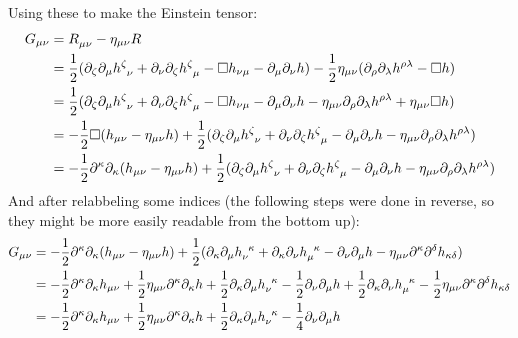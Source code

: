 \documentclass[12pt,a4]{article}
\begin{document}
\begin{enumerate}
    Using these to make the Einstein tensor:
    \begin{align*}
      G_{\mu\nu}  &= \tensor{R}{_\mu_\nu} - \eta_{\mu\nu}R\\
                  &= \frac{1}{2} (\partial_\zeta \partial_\mu\tensor{h}{^\zeta_\nu} + \partial_\nu \partial_\zeta \tensor{h}{^\zeta_\mu} - \Box h_{\nu\mu} - \partial_\mu \partial_\nu h) -\frac{1}{2}\eta_{\mu\nu}(\partial_\rho \partial_\lambda\tensor{h}{^\rho^\lambda}- \Box h)\\
                  &= \frac{1}{2} (\partial_\zeta \partial_\mu\tensor{h}{^\zeta_\nu} + \partial_\nu \partial_\zeta \tensor{h}{^\zeta_\mu} - \Box h_{\nu\mu} - \partial_\mu \partial_\nu h -\eta_{\mu\nu}\partial_\rho \partial_\lambda\tensor{h}{^\rho^\lambda} + \eta_{\mu\nu}\Box h)\\
                  &= -\frac{1}{2}\Box( h_{\mu\nu} -  \eta_{\mu\nu} h) + \frac{1}{2} (\partial_\zeta \partial_\mu\tensor{h}{^\zeta_\nu} + \partial_\nu \partial_\zeta \tensor{h}{^\zeta_\mu} -  \partial_\mu \partial_\nu h -\eta_{\mu\nu}\partial_\rho \partial_\lambda\tensor{h}{^\rho^\lambda})\\
                  &= -\frac{1}{2}\partial^\kappa\partial_\kappa( h_{\mu\nu} -  \eta_{\mu\nu} h) + \frac{1}{2} (\partial_\zeta \partial_\mu\tensor{h}{^\zeta_\nu} + \partial_\nu \partial_\zeta \tensor{h}{^\zeta_\mu} -  \partial_\mu \partial_\nu h -\eta_{\mu\nu}\partial_\rho \partial_\lambda\tensor{h}{^\rho^\lambda})
    \end{align*}
    And after relabbeling some indices (the following steps were done in reverse, so they might be more easily readable from the bottom up):
    \begin{align*}
      G_{\mu\nu} &= -\frac{1}{2}\partial^\kappa\partial_\kappa ( h_{\mu\nu} - \eta_{\mu\nu}h) + \frac{1}{2}(\partial_\kappa \partial_{\mu} \tensor{h}{_\nu^\kappa} + \partial_\kappa \partial_{\nu} \tensor{h}{_\mu^\kappa} - \partial_\nu \partial_{\mu}h - \eta_{\mu\nu} \partial^\kappa \partial^\delta h_{\kappa\delta})\\
                  &= -\frac{1}{2}\partial^\kappa\partial_\kappa h_{\mu\nu} + \frac{1}{2}\eta_{\mu\nu}\partial^\kappa\partial_\kappa h + \frac{1}{2}\partial_\kappa \partial_{\mu} \tensor{h}{_\nu^\kappa} - \frac{1}{2}\partial_\nu \partial_{\mu}h + \frac{1}{2}\partial_\kappa \partial_{\nu} \tensor{h}{_\mu^\kappa} - \frac{1}{2}\eta_{\mu\nu} \partial^\kappa \partial^\delta h_{\kappa\delta}\\
                  &= -\frac{1}{2}\partial^\kappa\partial_\kappa h_{\mu\nu} + \frac{1}{2}\eta_{\mu\nu}\partial^\kappa\partial_\kappa h + \frac{1}{2}\partial_\kappa \partial_{\mu} \tensor{h}{_\nu^\kappa} - \frac{1}{4}\partial_\nu \partial_{\mu}h\\

\end{align*}
\end{enumerate}
\end{document}
